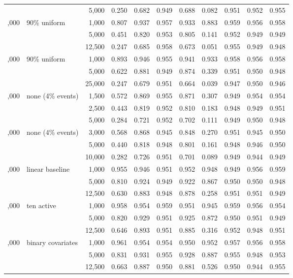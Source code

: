 \begin{tabular}{rlrrrrrrrrr}
 &  & 5,000 & 0.250 & 0.682 & 0.949 & 0.688 & 0.082 & 0.951 & 0.952 & 0.955\\
\addlinespace
25,000 & 90\% uniform & 1,000 & 0.807 & 0.937 & 0.957 & 0.933 & 0.883 & 0.959 & 0.956 & 0.958\\
 &  & 5,000 & 0.451 & 0.820 & 0.953 & 0.805 & 0.141 & 0.952 & 0.949 & 0.949\\
 &  & 12,500 & 0.247 & 0.685 & 0.958 & 0.673 & 0.051 & 0.955 & 0.949 & 0.948\\
\addlinespace
50,000 & 90\% uniform & 1,000 & 0.893 & 0.946 & 0.955 & 0.941 & 0.933 & 0.958 & 0.956 & 0.958\\
 &  & 5,000 & 0.622 & 0.881 & 0.949 & 0.874 & 0.339 & 0.951 & 0.950 & 0.948\\
 &  & 25,000 & 0.247 & 0.679 & 0.951 & 0.664 & 0.039 & 0.947 & 0.950 & 0.946\\
\addlinespace
25,000 & none (4\% events) & 1,500 & 0.572 & 0.869 & 0.955 & 0.871 & 0.307 & 0.949 & 0.954 & 0.954\\
 &  & 2,500 & 0.443 & 0.819 & 0.952 & 0.810 & 0.183 & 0.948 & 0.949 & 0.951\\
 &  & 5,000 & 0.284 & 0.721 & 0.952 & 0.702 & 0.111 & 0.949 & 0.950 & 0.948\\
\addlinespace
50,000 & none (4\% events) & 3,000 & 0.568 & 0.868 & 0.945 & 0.848 & 0.270 & 0.951 & 0.945 & 0.950\\
 &  & 5,000 & 0.440 & 0.818 & 0.948 & 0.801 & 0.161 & 0.948 & 0.946 & 0.950\\
 &  & 10,000 & 0.282 & 0.726 & 0.951 & 0.701 & 0.089 & 0.949 & 0.944 & 0.949\\
\addlinespace
25,000 & linear baseline & 1,000 & 0.955 & 0.946 & 0.951 & 0.952 & 0.948 & 0.949 & 0.956 & 0.959\\
 &  & 5,000 & 0.810 & 0.924 & 0.949 & 0.922 & 0.867 & 0.950 & 0.950 & 0.948\\
 &  & 12,500 & 0.630 & 0.883 & 0.948 & 0.878 & 0.258 & 0.951 & 0.951 & 0.949\\
\addlinespace
25,000 & ten active & 1,000 & 0.958 & 0.954 & 0.959 & 0.951 & 0.945 & 0.959 & 0.956 & 0.954\\
 &  & 5,000 & 0.820 & 0.929 & 0.951 & 0.925 & 0.872 & 0.950 & 0.951 & 0.949\\
 &  & 12,500 & 0.646 & 0.893 & 0.951 & 0.885 & 0.316 & 0.952 & 0.948 & 0.951\\
\addlinespace
25,000 & binary covariates & 1,000 & 0.961 & 0.954 & 0.954 & 0.950 & 0.952 & 0.957 & 0.956 & 0.958\\
 &  & 5,000 & 0.831 & 0.931 & 0.955 & 0.928 & 0.887 & 0.955 & 0.948 & 0.953\\
 &  & 12,500 & 0.663 & 0.887 & 0.950 & 0.881 & 0.526 & 0.950 & 0.944 & 0.955\\
\bottomrule
\end{tabular}
